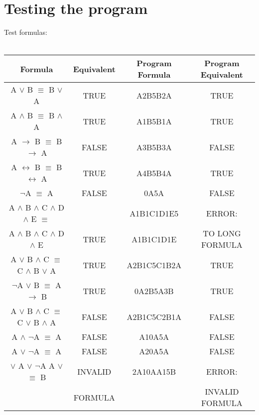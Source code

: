 \documentclass[11pt, a4paper, titlepage, block]{article}
\begin{document}
\section{Testing the program}
	Test formulas:\\
	\\
	\begin{tabular}{|c|c|c|c|}
		\hline
			Formula & Equivalent & Program Formula & Program Equivalent \\
		\hline
			A $\vee $ B $\equiv $ B $\vee $ A & TRUE & A2B5B2A & TRUE\\
		\hline
			A $\wedge $ B $\equiv $ B $\wedge $ A & TRUE & A1B5B1A & TRUE\\
		\hline
			A $\rightarrow  $ B $\equiv $ B $\rightarrow $ A & FALSE & A3B5B3A & FALSE\\
		\hline
			A $\leftrightarrow   $ B $\equiv $ B $\leftrightarrow  $ A & TRUE & A4B5B4A & TRUE\\
		\hline
			$\neg $A $\equiv $ A & FALSE & 0A5A & FALSE\\
		\hline
			A $\wedge $ B $\wedge $  C $\wedge $ D $\wedge $  E $\equiv $ & & A1B1C1D1E5 & ERROR:\\ 

			A $\wedge $ B $\wedge $  C $\wedge $ D $\wedge $  E & TRUE & A1B1C1D1E & TO LONG FORMULA\\
		\hline
			A $\vee $ B $\wedge $ C $\equiv $ C $\wedge $ B $\vee $ A & TRUE & A2B1C5C1B2A & TRUE\\
		\hline
			$\neg $A $\vee $ B $\equiv $ A $\rightarrow  $ B& TRUE & 0A2B5A3B & TRUE\\
		\hline
			A $\vee $ B $\wedge $ C $\equiv $ C $\vee $ B $\wedge $ A & FALSE & A2B1C5C2B1A & FALSE\\
		\hline
			A $\wedge $ $\neg $A $\equiv $ A & FALSE & A10A5A & FALSE\\
		\hline
			A $\vee $ $\neg $A $\equiv $ A & FALSE & A20A5A & FALSE\\
		\hline
			$\vee $ A $\vee $ $\neg $A A $\vee $ $\equiv $ B & INVALID & 2A10AA15B & ERROR:\\
			& FORMULA &   & INVALID FORMULA\\
		\hline
	\end{tabular}

	\newpage
\end{document}

